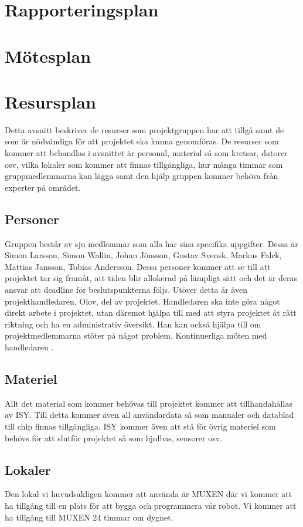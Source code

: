 \documentclass[a4paper,12pt]{article}
\begin{document}
\section{Rapporteringsplan}

\section{Mötesplan}

\section{Resursplan}	%
Detta avsnitt beskriver de resurser som projektgruppen har att tillgå samt de som är nödvändiga för att projektet ska kunna genomföras. De resurser som kommer att behandlas i avsnittet är personal, material så som kretsar, datorer osv, vilka lokaler som kommer att finnas tillgängliga, hur många timmar som gruppmedlemmarna kan lägga samt den hjälp gruppen kommer behöva från experter på området. 
\subsection{Personer}
Gruppen består av sju medlemmar som alla har sina specifika uppgifter. Dessa är Simon Larsson, Simon Wallin, Johan Jönsson, Gustav Svensk, Markus Falck, Mattias Jansson, Tobias Andersson. Dessa personer kommer att se till att projektet tar sig framåt, att tiden blir allokerad på lämpligt sätt och det är deras ansvar att deadline för beslutspunkterna följs. Utöver detta är även projekthandledaren, Olov, del av projektet. Handledaren ska inte göra något direkt arbete i projektet, utan däremot hjälpa till med att styra projektet åt rätt riktning och ha en administrativ översikt. Han kan också hjälpa till om projektmedlemmarna stöter på något problem. Kontinuerliga möten med handledaren .
\subsection{Materiel}
Allt det material som kommer behövas till projektet kommer att tillhandahållas av ISY. Till detta kommer även all användardata så som manualer och datablad till chip finnas tillgängliga. ISY kommer även att stå för övrig materiel som behövs för att slutför projektet så som hjulbas, sensorer osv.
\subsection{Lokaler}
Den lokal vi huvudsakligen kommer att använda är MUXEN där vi kommer att ha tillgång till en plats för att bygga och programmera vår robot. Vi kommer att ha tillgång till MUXEN 24 timmar om dygnet.
\end{document}
